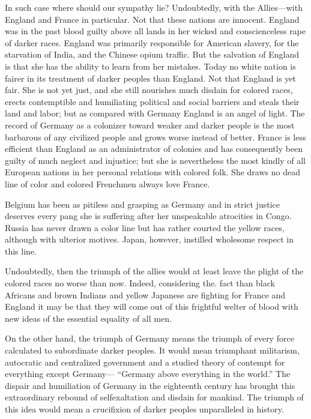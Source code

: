 \documentclass[letterpaper,10pt,english]{jupyterBook}
\begin{document}
\sphinxAtStartPar
In such case where should our sympathy lie? Undoubtedly, with the Allies—with England and France in particular. Not that these nations are innocent. England was in the past blood\sphinxhyphen{} guilty above all lands in her wicked and conscienceless rape of darker races. England was primarily responsible for American slavery, for the starvation of India, and the Chinese opium traffic. But the salvation of England is that she has the ability to learn from her mistakes. To\sphinxhyphen{}day no white nation is fairer in its treatment of darker peoples than England. Not that England is yet fair. She is not yet just, and she still nourishes much disdain for colored races, erects contemptible and humiliating political and social barriers and steals their land and labor; but as compared with Germany England is an angel of light. The record of Germany as a colonizer toward weaker and darker people is the most barbarous of any civilized people and grows worse instead of better. France is less efficient than England as an administrator of colonies and has consequently been guilty of much neglect and injustice; but she is nevertheless the most kindly of all European nations in her personal relations with colored folk. She draws no dead line of color and colored Frenchmen always love France.

\sphinxAtStartPar
Belgium has been as pitiless and grasping as Germany and in strict justice deserves every pang she is suffering after her unspeakable atrocities in Congo. Russia has never drawn a color line but has rather courted the yellow races, although with ulterior motives. Japan, however, instilled wholesome respect in this line.

\sphinxAtStartPar
Undoubtedly, then the triumph of the allies would at least leave the plight of the colored races no worse than now. Indeed, considering the. fact than black Africans and brown Indians and yellow Japanese are fighting for France and England it may be that they will come out of this frightful welter of blood with new ideas of the essential equality of all men.

\sphinxAtStartPar
On the other hand, the triumph of Germany means the triumph of every force calculated to subordinate darker peoples. It would mean triumphant militarism, autocratic and centralized government and a studied theory of contempt for everything except Germany— “Germany above everything in the world.” The dispair and humiliation of Germany in the eighteenth century has brought this extraordinary rebound of self\sphinxhyphen{}exaltation and disdain for mankind. The triumph of this idea would mean a crucifixion of darker peoples unparalleled in history.
\end{document}
